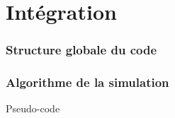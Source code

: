 \documentclass[french]{beamer}
\begin{document}
\section{Intégration}



\begin{frame}
    \frametitle{Structure globale du code}
\end{frame}

\begin{frame}
    \frametitle{Algorithme de la simulation}
    Pseudo-code
\end{frame}

\begin{frame}
\end{frame}
\end{document}

